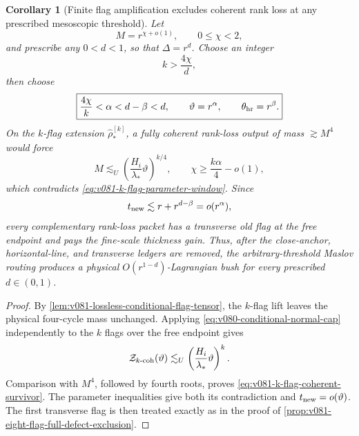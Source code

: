 \documentclass[10pt]{article}
\newtheorem{corollary}[theorem]{Corollary}
\begin{document}
\begin{corollary}[Finite flag amplification excludes coherent rank loss at any prescribed
mesoscopic threshold]
\label{cor:v081-k-flag-arbitrary-threshold}
Let
\[
M=r^{\chi+o(1)},
\qquad
0\le\chi<2,
\]
and prescribe any \(0<d<1\), so that \(\Delta=r^d\).  Choose an integer
\[
k>\frac{4\chi}{d},
\]
then choose
\begin{equation}
\label{eq:v081-k-flag-parameter-window}
\boxed{
\frac{4\chi}{k}<\alpha<d-\beta<d,
\qquad
\vartheta=r^\alpha,
\qquad
\theta_{\rm hr}=r^\beta.
}
\end{equation}
On the \(k\)-flag extension
\(\widehat\rho_*^{[k]}\), a fully coherent rank-loss output of mass
\(\gtrsim M^4\) would force
\begin{equation}
\label{eq:v081-k-flag-coherent-survivor}
\boxed{
M
\lesssim_U
\left(\frac{H_i}{\lambda_*}\vartheta\right)^{k/4},
\qquad
\chi\ge\frac{k\alpha}{4}-o(1),
}
\end{equation}
which contradicts \eqref{eq:v081-k-flag-parameter-window}.  Since
\[
t_{\rm new}
\lesssim
r+r^{d-\beta}
=o(r^\alpha),
\]
every complementary rank-loss packet has a transverse old flag at the free endpoint and pays the
fine-scale thickness gain.  Thus, after the close-anchor, horizontal-line, and transverse ledgers
are removed, the arbitrary-threshold Maslov routing produces a physical
\(O(r^{1-d})\)-Lagrangian bush for every prescribed \(d\in(0,1)\).
\end{corollary}

\begin{proof}
By
\cref{lem:v081-lossless-conditional-flag-tensor}, the \(k\)-flag lift leaves the physical
four-cycle mass unchanged.  Applying
\eqref{eq:v080-conditional-normal-cap} independently to the \(k\) flags over the free endpoint gives
\[
\mathcal Z_{k\text{-}\rm coh}(\vartheta)
\lesssim_U
\left(\frac{H_i}{\lambda_*}\vartheta\right)^k.
\]
Comparison with \(M^4\), followed by fourth roots, proves
\eqref{eq:v081-k-flag-coherent-survivor}.  The parameter inequalities give both its contradiction
and \(t_{\rm new}=o(\vartheta)\).  The first transverse flag is then treated exactly as in the proof
of \cref{prop:v081-eight-flag-full-defect-exclusion}.
\end{proof}
\end{document}
